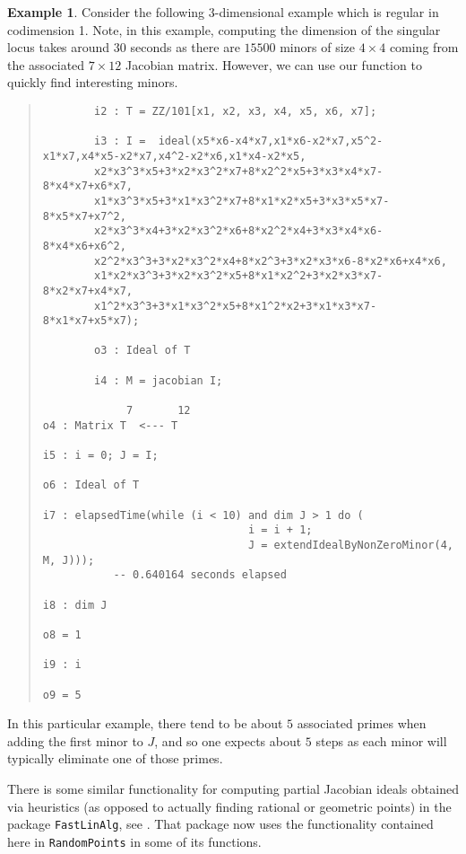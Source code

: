 \documentclass[11pt]{amsart}
\theoremstyle{definition}
\newtheorem{example}{Example}[section]
\begin{document}
\begin{example}
    Consider the following 3-dimensional example which is regular in codimension 1.  Note, in this example, computing the dimension of the singular locus takes around $30$ seconds as there are $15500$ minors of size $4 \times 4$ coming from the associated $7 \times 12$ Jacobian matrix.  However, we can use our function to quickly find interesting minors.
  {{\small\color{blue}
  \begin{quote}
\begin{verbatim}
		i2 : T = ZZ/101[x1, x2, x3, x4, x5, x6, x7];
		
		i3 : I =  ideal(x5*x6-x4*x7,x1*x6-x2*x7,x5^2-x1*x7,x4*x5-x2*x7,x4^2-x2*x6,x1*x4-x2*x5,
		x2*x3^3*x5+3*x2*x3^2*x7+8*x2^2*x5+3*x3*x4*x7-8*x4*x7+x6*x7,
		x1*x3^3*x5+3*x1*x3^2*x7+8*x1*x2*x5+3*x3*x5*x7-8*x5*x7+x7^2,
		x2*x3^3*x4+3*x2*x3^2*x6+8*x2^2*x4+3*x3*x4*x6-8*x4*x6+x6^2,
		x2^2*x3^3+3*x2*x3^2*x4+8*x2^3+3*x2*x3*x6-8*x2*x6+x4*x6,
		x1*x2*x3^3+3*x2*x3^2*x5+8*x1*x2^2+3*x2*x3*x7-8*x2*x7+x4*x7,
		x1^2*x3^3+3*x1*x3^2*x5+8*x1^2*x2+3*x1*x3*x7-8*x1*x7+x5*x7);
		
		o3 : Ideal of T
		
		i4 : M = jacobian I;

             7       12
o4 : Matrix T  <--- T          

i5 : i = 0; J = I;

o6 : Ideal of T

i7 : elapsedTime(while (i < 10) and dim J > 1 do (
                                i = i + 1;                       
                                J = extendIdealByNonZeroMinor(4, M, J)));
           -- 0.640164 seconds elapsed        

i8 : dim J

o8 = 1

i9 : i

o9 = 5
\end{verbatim}
\end{quote}
    }}    
    \noindent
    In this particular example, there tend to be about $5$ associated primes when adding the first minor to $J$, and so one expects about $5$ steps as each minor will typically eliminate one of those primes.
\end{example} 

There is some similar functionality for computing partial Jacobian ideals obtained via heuristics (as opposed to actually finding rational or geometric points) in the package {\tt FastLinAlg}, see \cite{FastLinAlgSource}.  That package now uses the functionality contained here in {\tt RandomPoints} in some of its functions.
\end{document}
